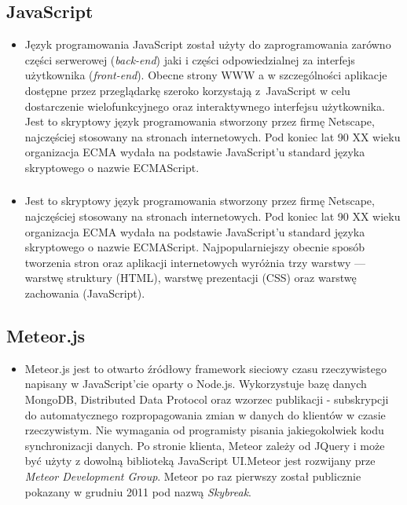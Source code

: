 \documentclass{beamer}
\newenvironment{justbe}%
{\setlength{\leftmargini}{0pt}\begin{itemize}\item[]}%
{\end{itemize}}
\begin{document}
\subsection{JavaScript}
\begin{frame}
	\begin{justbe}
	Język programowania JavaScript został użyty do zaprogramowania zarówno części serwerowej (\textit{back-end}) jaki i części odpowiedzialnej za interfejs użytkownika (\textit{front-end}). Obecne strony WWW a w szczególności aplikacje dostępne przez przeglądarkę szeroko korzystają z~JavaScript w celu dostarczenie wielofunkcyjnego oraz interaktywnego interfejsu użytkownika. Jest to skryptowy język programowania stworzony przez firmę Netscape, najczęściej stosowany na stronach internetowych. Pod koniec lat 90 XX wieku organizacja ECMA wydała na podstawie JavaScript'u standard języka skryptowego o nazwie ECMAScript.
	\end{justbe}
\end{frame}
\begin{frame}
 \frametitle{}
 \begin{justbe}
  Jest to skryptowy język programowania stworzony przez firmę Netscape, najczęściej stosowany na stronach internetowych. Pod koniec lat 90 XX wieku organizacja ECMA wydała na podstawie JavaScript'u standard języka skryptowego o nazwie ECMAScript. Najpopularniejszy obecnie sposób tworzenia stron oraz aplikacji internetowych wyróżnia trzy warstwy --- warstwę struktury (HTML), warstwę prezentacji (CSS) oraz warstwę zachowania (JavaScript).
 \end{justbe}
\end{frame}

	\subsection{Meteor.js}
\begin{frame}
	\begin{justbe}
	Meteor.js jest to otwarto źródłowy framework sieciowy czasu rzeczywistego napisany w JavaScript'cie oparty o Node.js. Wykorzystuje bazę danych MongoDB, Distributed Data Protocol oraz wzorzec publikacji - subskrypcji do automatycznego rozpropagowania zmian w danych do klientów w czasie rzeczywistym. Nie wymagania od programisty pisania jakiegokolwiek kodu synchronizacji danych. Po stronie klienta, Meteor zależy od JQuery i może być użyty z dowolną biblioteką JavaScript UI.Meteor jest rozwijany prze \textit{Meteor Development Group}. Meteor po raz pierwszy został publicznie pokazany w grudniu 2011 pod nazwą \textit{Skybreak}.
	\end{justbe}
\end{frame}
\end{document}
